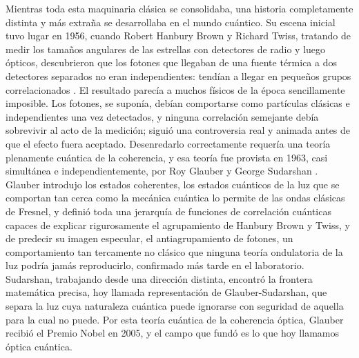 	Mientras toda esta maquinaria clásica se consolidaba, una historia completamente distinta y más extraña se desarrollaba en el mundo cuántico. Su escena inicial tuvo lugar en 1956, cuando Robert Hanbury Brown y Richard Twiss, tratando de medir los tamaños angulares de las estrellas con detectores de radio y luego ópticos, descubrieron que los fotones que llegaban de una fuente térmica a dos detectores separados no eran independientes: tendían a llegar en pequeños grupos correlacionados \cite{hanburybrown1956correlation}. El resultado parecía a muchos físicos de la época sencillamente imposible. Los fotones, se suponía, debían comportarse como partículas clásicas e independientes una vez detectados, y ninguna correlación semejante debía sobrevivir al acto de la medición; siguió una controversia real y animada antes de que el efecto fuera aceptado. Desenredarlo correctamente requería una teoría plenamente cuántica de la coherencia, y esa teoría fue provista en 1963, casi simultánea e independientemente, por Roy Glauber \cite{glauber1963quantum} y George Sudarshan \cite{sudarshan1963equivalence}. Glauber introdujo los estados coherentes, los estados cuánticos de la luz que se comportan tan cerca como la mecánica cuántica lo permite de las ondas clásicas de Fresnel, y definió toda una jerarquía de funciones de correlación cuánticas capaces de explicar rigurosamente el agrupamiento de Hanbury Brown y Twiss, y de predecir su imagen especular, el antiagrupamiento de fotones, un comportamiento tan tercamente no clásico que ninguna teoría ondulatoria de la luz podría jamás reproducirlo, confirmado más tarde en el laboratorio. Sudarshan, trabajando desde una dirección distinta, encontró la frontera matemática precisa, hoy llamada representación de Glauber-Sudarshan, que separa la luz cuya naturaleza cuántica puede ignorarse con seguridad de aquella para la cual no puede. Por esta teoría cuántica de la coherencia óptica, Glauber recibió el Premio Nobel en 2005, y el campo que fundó es lo que hoy llamamos óptica cuántica.

